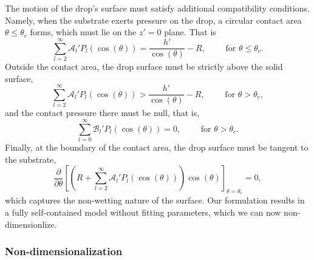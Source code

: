 \documentclass{jfm}
\begin{document}
The motion of the drop's surface must satisfy additional compatibility conditions. Namely, when the substrate exerts pressure on the drop, a circular contact area $\theta\leq\theta_c$ forms, which must lie on the $z'=0$ plane. That is
\begin{equation}
    \sum\limits_{l=2}^\infty {\mathscr{A}_l'P_l(\cos(\theta))} = \frac{h'}{\cos(\theta)}-R, \qquad \text{ for } \theta \leq \theta_c.
\end{equation}
Outside the contact area, the drop surface must be strictly above the solid surface,
\begin{equation}
    \sum\limits_{l=2}^\infty {\mathscr{A}_l'P_l(\cos(\theta))} > \frac{h'}{\cos(\theta)}-R, \qquad \text{ for } \theta > \theta_c,
\end{equation}
and the contact pressure there must be null, that is,
\begin{equation}
    \sum\limits_{l=0}^\infty {\mathscr{B}_l'P_l(\cos(\theta))} = 0, \qquad  \text{ for } \theta > \theta_c.
\end{equation}
Finally, at the boundary of the contact area, the drop surface must be tangent to the substrate, 
\begin{equation}
\frac{\partial}{\partial \theta}\left[\left(R+\sum\limits_{l=2}^\infty {\mathscr{A}_l'P_l(\cos(\theta))}\right)\cos(\theta)\right]_{\theta=\theta_c} = 0,
\end{equation}
which captures the non-wetting nature of the surface. Our formulation results in a fully self-contained model without fitting parameters, which we can now non-dimensionlize.


\subsubsection{Non-dimensionalization} \label{subsubsec:nondimensionalization}
\end{document}
